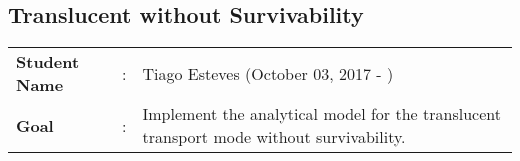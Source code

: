 \clearpage

\subsection{Translucent without Survivability}\label{analytical_Transluc_Survivability}
\begin{tcolorbox}	
\begin{tabular}{p{2.75cm} p{0.2cm} p{10.5cm}} 	
\textbf{Student Name}  &:& Tiago Esteves    (October 03, 2017 - )\\
\textbf{Goal}          &:& Implement the analytical model for the translucent transport mode without survivability.
\end{tabular}
\end{tcolorbox}
\vspace{11pt}

